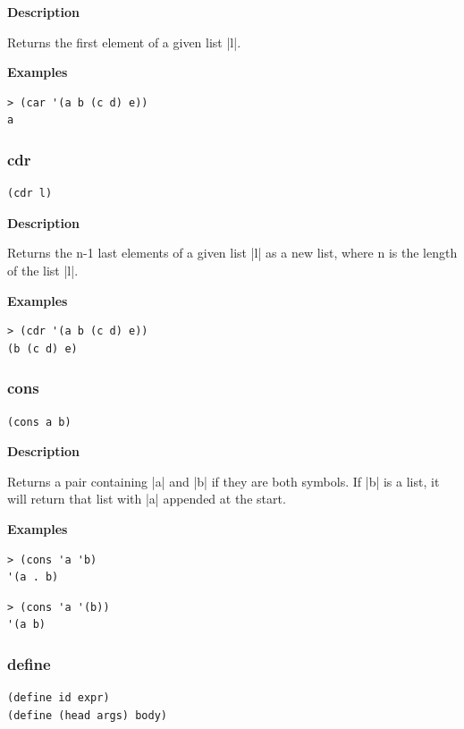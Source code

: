 \documentclass[a4paper]{article}
\begin{document}
\textbf{Description}

Returns the first element of a given list |l|.

\textbf{Examples}

\begin{lstlisting}
> (car '(a b (c d) e))
a
\end{lstlisting}

\subsubsection{cdr}

\begin{lstlisting}[frame=none]
(cdr l)
\end{lstlisting}

\textbf{Description}

Returns the n-1 last elements of a given list |l| as a new list, where n is the length of the list |l|.

\textbf{Examples}

\begin{lstlisting}
> (cdr '(a b (c d) e))
(b (c d) e)
\end{lstlisting}

\subsubsection{cons}

\begin{lstlisting}[frame=none]
(cons a b)
\end{lstlisting}

\textbf{Description}

Returns a pair containing |a| and |b| if they are both symbols. If |b| is a list, it will return that list with |a| appended at the start.

\textbf{Examples}

\begin{lstlisting}
> (cons 'a 'b)
'(a . b)
\end{lstlisting}

\begin{lstlisting}
> (cons 'a '(b))
'(a b)
\end{lstlisting}

\subsubsection{define}

\begin{lstlisting}[frame=none]
(define id expr)
(define (head args) body)
\end{lstlisting}
\end{document}
